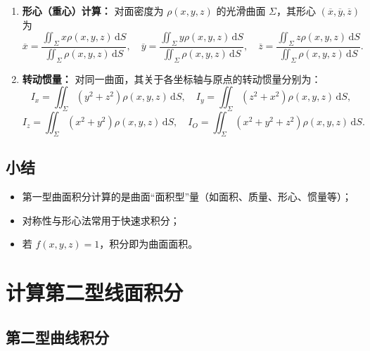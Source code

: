 \begin{enumerate}
      \item \textbf{形心（重心）计算：}
            对面密度为 $\rho(x,y,z)$ 的光滑曲面 $\Sigma$，其形心 $(\overline{x},\overline{y},\overline{z})$ 为
            \[
                  \overline{x} = \frac{\iint_{\Sigma} x\rho(x,y,z)\,\mathrm{d}S}{\iint_{\Sigma}\rho(x,y,z)\,\mathrm{d}S},\quad
                  \overline{y} = \frac{\iint_{\Sigma} y\rho(x,y,z)\,\mathrm{d}S}{\iint_{\Sigma}\rho(x,y,z)\,\mathrm{d}S},\quad
                  \overline{z} = \frac{\iint_{\Sigma} z\rho(x,y,z)\,\mathrm{d}S}{\iint_{\Sigma}\rho(x,y,z)\,\mathrm{d}S}.
            \]

      \item \textbf{转动惯量：}
            对同一曲面，其关于各坐标轴与原点的转动惯量分别为：
            \[
                  I_x = \iint_{\Sigma}(y^2+z^2)\rho(x,y,z)\,\mathrm{d}S,\quad
                  I_y = \iint_{\Sigma}(z^2+x^2)\rho(x,y,z)\,\mathrm{d}S,
            \]
            \[
                  I_z = \iint_{\Sigma}(x^2+y^2)\rho(x,y,z)\,\mathrm{d}S,\quad
                  I_O = \iint_{\Sigma}(x^2+y^2+z^2)\rho(x,y,z)\,\mathrm{d}S.
            \]
\end{enumerate}


\subsection*{小结}

\begin{itemize}
      \item 第一型曲面积分计算的是曲面“面积型”量（如面积、质量、形心、惯量等）；
      \item 对称性与形心法常用于快速求积分；
      \item 若 $f(x,y,z)=1$，积分即为曲面面积。
\end{itemize}

\section{计算第二型线面积分}
\subsection{第二型曲线积分}

